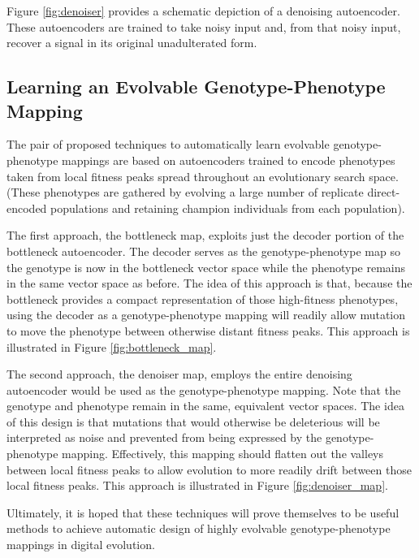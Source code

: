 

Figure \ref{fig:denoiser} provides a schematic depiction of a denoising autoencoder.
These autoencoders are trained to take noisy input and, from that noisy input, recover a signal in its original unadulterated form.

\subsection{Learning an Evolvable Genotype-Phenotype Mapping}

The pair of proposed techniques to automatically learn evolvable genotype-phenotype mappings are based on autoencoders trained to encode phenotypes taken from local fitness peaks spread throughout an evolutionary search space.
(These phenotypes are gathered by evolving a large number of replicate direct-encoded populations and retaining champion individuals from each population).



The first approach, the bottleneck map, exploits just the decoder portion of the bottleneck autoencoder.
The decoder serves as the genotype-phenotype map so the genotype is now in the bottleneck vector space while the phenotype remains in the same vector space as before.
The idea of this approach is that, because the bottleneck provides a compact representation of those high-fitness phenotypes, using the decoder as a genotype-phenotype mapping will readily allow mutation to move the phenotype between otherwise distant fitness peaks.
This approach is illustrated in Figure \ref{fig:bottleneck_map}.



The second approach, the denoiser map, employs the entire denoising autoencoder would be used as the genotype-phenotype mapping.
Note that the genotype and phenotype remain in the same, equivalent vector spaces.
The idea of this design is that mutations that would otherwise be deleterious will be interpreted as noise and prevented from being expressed by the genotype-phenotype mapping.
Effectively, this mapping should flatten out the valleys between local fitness peaks to allow evolution to more readily drift between those local fitness peaks.
This approach is illustrated in Figure \ref{fig:denoiser_map}.

Ultimately, it is hoped that these techniques will prove themselves to be useful methods to achieve automatic design of highly evolvable genotype-phenotype mappings in digital evolution.
